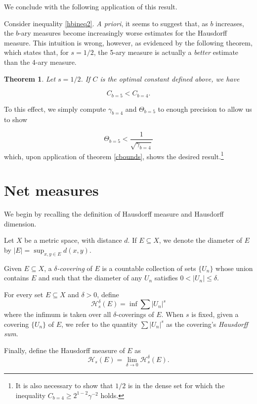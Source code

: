 \documentclass[11pt, reqno]{amsart}
\newcommand{\HH}{\mathcal{H}}
\newtheorem{theorem}{Theorem}
\begin{document}
We conclude with the following application of this result.

Consider inequality \eqref{hbineq2}. \emph{A priori}, it seems to suggest that, as $b$ increases, the $b$-ary measures become increasingly worse estimates for the Hausdorff measure. This intuition is wrong, however, as evidenced by the following theorem, which states that, for $s = 1/2$, the 5-ary measure is actually a \emph{better} estimate than the 4-ary measure.

\begin{theorem}
Let $s = 1/2$. If $C$ is the optimal constant defined above, we have

\[C_{b = 5} < C_{b = 4}.\]
\end{theorem}

To this effect, we simply compute $\gamma_{b = 4}$ and $\Theta_{b = 5}$ to enough precision to allow us to show

\[\Theta_{b = 5} < \frac 1 {\sqrt{\gamma_{b = 4}}}\]
which, upon application of theorem \ref{cbounds}, shows the desired result.\footnote{It is also necessary to show that $1/2$ is in the dense set for which the inequality $C_{b=4} \geq 2^{1-2} \gamma^{-2}$ holds.}

\section{Net measures}

We begin by recalling the definition of Hausdorff measure and Hausdorff dimension.

Let $X$ be a metric space, with distance $d$. If $E \subseteq X$, we denote the diameter of $E$ by $\lvert E \rvert = \sup_{x, y \in E} d(x,y)$.

Given $E \subseteq X$, a \emph{$\delta$-covering} of $E$ is a countable collection of sets $\{U_n\}$ whose union contains $E$ and such that the diameter of any $U_n$ satisfies $0 < \lvert U_n \rvert \leq \delta$.

For every set $E \subseteq X$ and $\delta > 0$, define
\begin{equation}\label{hausdorffdeltadef}
\HH_s^\delta(E) = \inf \sum \lvert U_n \rvert^s
\end{equation}
where the infimum is taken over all $\delta$-coverings of $E$. When $s$ is fixed, given a covering $\{U_n\}$ of $E$, we refer to the quantity $\sum \lvert U_n \rvert^s$ as the covering's \emph{Hausdorff sum}.

Finally, define the Hausdorff measure of $E$ as
\begin{equation}\label{hausdorffdef}
\HH_s(E) = \lim_{\delta \to 0} \HH_s^\delta(E).
\end{equation}
\end{document}
